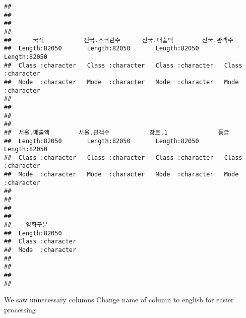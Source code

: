 \documentclass[
]{article}
\begin{document}
\begin{verbatim}
##                                                                             
##                                                                             
##                                                                             
##                                                                             
##      국적           전국.스크린수      전국.매출액        전국.관객수       
##  Length:82050       Length:82050       Length:82050       Length:82050      
##  Class :character   Class :character   Class :character   Class :character  
##  Mode  :character   Mode  :character   Mode  :character   Mode  :character  
##                                                                             
##                                                                             
##                                                                             
##                                                                             
##  서울.매출액        서울.관객수           장르.1              등급          
##  Length:82050       Length:82050       Length:82050       Length:82050      
##  Class :character   Class :character   Class :character   Class :character  
##  Mode  :character   Mode  :character   Mode  :character   Mode  :character  
##                                                                             
##                                                                             
##                                                                             
##                                                                             
##    영화구분        
##  Length:82050      
##  Class :character  
##  Mode  :character  
##                    
##                    
##                    
## 
\end{verbatim}

We saw unnecessary columns Change name of column to english for easier
processing
\end{document}
